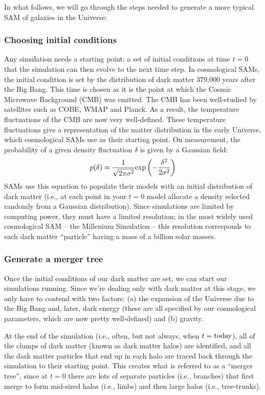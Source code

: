 \documentclass[11pt]{article}
\begin{document}
In what follows, we will go through the steps needed to generate a
more typical SAM of galaxies in the Universe:

\subsubsection{Choosing initial conditions}
Any simulation needs a starting point: a set of initial conditions at
time $t=0$ that the simulation can then evolve to the next time
step. In cosmological SAMs, the initial condition is set by the
distribution of dark matter 379,000 years after the Big Bang. This
time is chosen as it is the point at which the Cosmic Microwave
Background (CMB) was emitted. The CMB has been well-studied by
satellites such as COBE, WMAP and Planck. As a result, the temperature
fluctuations of the CMB are now very well-defined. These temperature
fluctuations give a representation of the matter distribution in the
early Universe, which cosmological SAMs use as their starting
point. On measurement, the probability of a given density fluctuation
$\delta$ is given by a Gaussian field:
\begin{equation}
p(\delta) = \frac{1}{\sqrt{2\pi\sigma^2}}{\rm exp}\left(-\frac{\delta^2}{2\sigma^2}\right)
\end{equation}
SAMs use this equation to populate their models with an initial
distribution of dark matter (i.e., at each point in your $t=0$ model
allocate a density selected randomly from a Gaussian
distribution). Since simulations are limited by computing power, they
must have a limited resolution; in the most widely used cosmological
SAM -- the Millenium Simulation -- this resolution corresponds to each
dark matter ``particle'' having a mass of a billion solar masses.

\subsubsection{Generate a merger tree}
Once the initial conditions of our dark matter are set, we can start
our simulations running. Since we're dealing only with dark matter at
this stage, we only have to contend with two factors: (a) the
expansion of the Universe due to the Big Bang and, later, dark energy
(these are all specified by our cosmological parameters, which are now
pretty well-defined) and (b) gravity.

At the end of the simulation (i.e., often, but not always, when
$t={\rm today}$), all of the clumps of dark matter (known as dark
matter halos) are identified, and all the dark matter particles that
end up in each halo are traced back through the simulation to their
starting point. This creates what is referred to as a ``merger tree'',
since at $t=0$ there are lots of separate particles (i.e., branches)
that first merge to form mid-sized halos (i.e., limbs) and then large
halos (i.e., tree-trunks).
\end{document}

